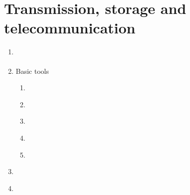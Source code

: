 \documentclass[letterpaper,10pt,english]{jupyterBook}
\begin{document}
\chapter{Transmission, storage and telecommunication}
\label{\detokenize{Transmission_storage_and_telecommunication:transmission-storage-and-telecommunication}}\label{\detokenize{Transmission_storage_and_telecommunication::doc}}\begin{enumerate}
%
\item {} 
\sphinxAtStartPar
{\hyperref[\detokenize{Transmission/Design_goals::doc}]{}}

\item {} 
\sphinxAtStartPar
Basic tools
\begin{enumerate}
%
\item {} 
\sphinxAtStartPar
{\hyperref[\detokenize{Transmission/Modified_discrete_cosine_transform_MDCT::doc}]{}}

\item {} 
\sphinxAtStartPar
{\hyperref[\detokenize{Transmission/Entropy_coding::doc}]{}}

\item {} 
\sphinxAtStartPar
{\hyperref[\detokenize{Transmission/Perceptual_modelling_in_speech_and_audio_coding::doc}]{}}

\item {} 
\sphinxAtStartPar
{\hyperref[\detokenize{Modelling/Vector_quantization_VQ::doc}]{}}

\item {} 
\sphinxAtStartPar
{\hyperref[\detokenize{Representations/Linear_prediction::doc}]{}}

\end{enumerate}

\item {} 
\sphinxAtStartPar
{\hyperref[\detokenize{Transmission/Code-excited_linear_prediction_CELP::doc}]{}}

\item {} 
\sphinxAtStartPar
{\hyperref[\detokenize{Transmission/Frequency-domain_coding::doc}]{}}

\end{enumerate}
\end{document}
